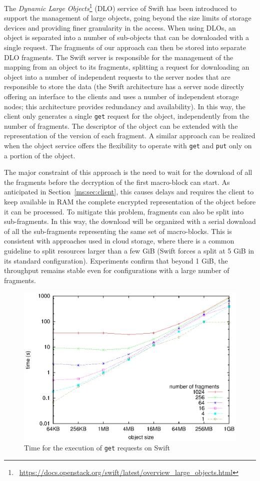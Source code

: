 \medskip
{}  
The {\em Dynamic Large Objects}\footnote{\ \tiny{\url{https://docs.openstack.org/swift/latest/overview_large_objects.html}}} (DLO) service of Swift has been introduced to support the management of large objects, going beyond the size limits of storage devices and providing finer granularity in the access. When using DLOs, an object is separated into a number of sub-objects that can be downloaded with a single request. The fragments of our approach can then be stored into separate DLO fragments. The Swift server is responsible for the management of the mapping from an object to its fragments, splitting a request for downloading an object into a number of independent requests to the server nodes that are responsible to store the data (the Swift architecture has a server node directly offering an interface to the clients and uses a number of independent storage nodes; this architecture provides redundancy and availability). In this way, the client only generates a single {\tt get} request for the object, independently from the number of fragments. The descriptor of the object can be extended with the representation of the version of each fragment. A similar approach can be realized when the object service offers the flexibility to operate with {\tt get} and {\tt put} only on a portion of the object.

The major constraint of this approach is the need to wait for the download of all the fragments before the decryption of the first macro-block can start. As anticipated in Section~\ref{ms:sec:client}, this causes delays and requires the client to keep available in RAM the complete encrypted representation of the object before it can be processed. To mitigate this problem, fragments can also be split into sub-fragments. In this way, the download will be organized with a serial download of all the sub-fragments representing the same set of macro-blocks. This is consistent with approaches used in cloud storage, where there is a common guideline to split resources larger than a few GiB (Swift forces a split at 5 GiB in its standard configuration). Experiments confirm that beyond 1 GiB, the throughput remains stable even for configurations with a large number of fragments.

\begin{figure}[t]
\centering
\includegraphics[width=0.8\columnwidth,valign=t]{figures/fig10}
\caption{\label{ms:fig:getPlain}Time for the execution of {\tt get} requests on Swift}
\end{figure}

